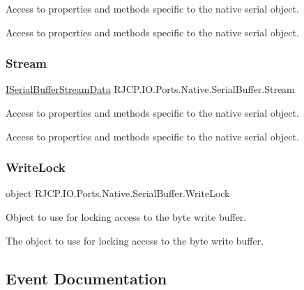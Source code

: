 Access to properties and methods specific to the native serial object. 

Access to properties and methods specific to the native serial object. \mbox{\label{class_r_j_c_p_1_1_i_o_1_1_ports_1_1_native_1_1_serial_buffer_a83712b1cfa86968f5723eec218c5d869}} 
\subsubsection{\texorpdfstring{Stream}{Stream}}
{\footnotesize\ttfamily \mbox{\hyperlink{interface_r_j_c_p_1_1_i_o_1_1_ports_1_1_native_1_1_i_serial_buffer_stream_data}{I\+Serial\+Buffer\+Stream\+Data}} R\+J\+C\+P.\+I\+O.\+Ports.\+Native.\+Serial\+Buffer.\+Stream\hspace{0.3cm}{\ttfamily [get]}}



Access to properties and methods specific to the native serial object. 

Access to properties and methods specific to the native serial object. \mbox{\label{class_r_j_c_p_1_1_i_o_1_1_ports_1_1_native_1_1_serial_buffer_ac67cc8962ba8aefbe4822846b763ac36}} 
\subsubsection{\texorpdfstring{WriteLock}{WriteLock}}
{\footnotesize\ttfamily object R\+J\+C\+P.\+I\+O.\+Ports.\+Native.\+Serial\+Buffer.\+Write\+Lock\hspace{0.3cm}{\ttfamily [get]}}



Object to use for locking access to the byte write buffer. 

The object to use for locking access to the byte write buffer. 

\subsection{Event Documentation}
\mbox{\label{class_r_j_c_p_1_1_i_o_1_1_ports_1_1_native_1_1_serial_buffer_a579db9204c3b8737905631ee30dd7d14}} 
